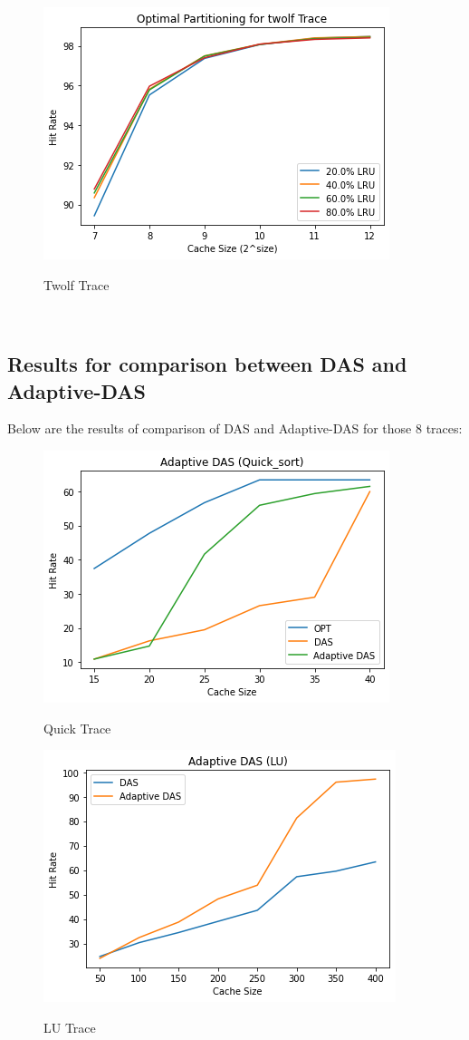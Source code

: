\documentclass[conference]{IEEEtran}
\begin{document}
 \begin{figure}
        \centering
       \includegraphics[scale=0.6]{twolf_partition.png}~
       \caption{Twolf Trace}\label{Fig:1}
 \end{figure}
\\

\newpage
\subsection{\textbf{Results for comparison between DAS and Adaptive-DAS}}
Below are the results of comparison of DAS and Adaptive-DAS for those 8 traces:

 \begin{figure}
        \centering
       \includegraphics[scale=0.6]{adatpive_qs.png}~
       \caption{Quick Trace}\label{Fig:1}
 \end{figure}

 \begin{figure}
        \centering
       \includegraphics[scale=0.6]{adaptive_lu.png}~
       \caption{LU Trace}\label{Fig:1}
 \end{figure}
\end{document}
